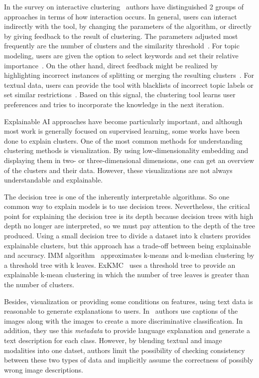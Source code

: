 \documentclass[
 twocolumn,
 hf,
]{ceurart}
\begin{document}
In the survey on interactive clustering~\cite{10.1145/3340960} authors have distinguished 2 groups of approaches in terms of how interaction occurs.
In general, users can interact indirectly with the tool, by changing the parameters of the algorithm, or directly by giving feedback to the result of clustering.
The parameters adjusted most frequently are the number of clusters and the similarity threshold~\cite{10.1007/978-3-319-23461-8_43,10.1016/j.eswa.2017.11.055}.
For topic modeling, users are given the option to select keywords and set their relative importance~\cite{ElAssady2018ProgressiveLO}. %
On the other hand, direct feedback might be realized by highlighting incorrect instances of splitting or merging the resulting clusters~\cite{10.1155/2017/4915828}. %
For textual data, users can provide the tool with blacklists of incorrect topic labels or set similar restrictions~\cite{Chang2016AppGrouperKI}. %
Based on this signal, the clustering tool learns user preferences and tries to incorporate the knowledge in the next iteration.

Explainable AI approaches have become particularly important, and although most work is generally focused on supervised learning, some works have been done to explain clusters.
One of the most common methods for understanding clustering methods is visualization. 
By using low-dimensionality embedding and displaying them in two- or three-dimensional dimensions, one can get an overview of the clusters and their data. 
However, these visualizations are not always understandable and explainable. 

The decision tree is one of the inherently interpretable algorithms. 
So one common way to explain models is to use decision trees. 
Nevertheless, the critical point for explaining the decision tree is its depth because decision trees with high depth no longer are interpreted, so we must pay attention to the depth of the tree produced. 
Using a small decision tree to divide a dataset into k clusters provides explainable clusters, but this approach has a trade-off between being explainable and accuracy. 
IMM algorithm~\cite{dasgupta2020explainable} approximates k-means and k-median clustering by a threshold tree with k leaves.
ExKMC~\cite{frost2020exkmc} uses a threshold tree to provide an explainable k-mean clustering in which the number of tree leaves is greater than the number of clusters.

Besides, visualization or providing some conditions on features, using text data is reasonable to generate explanations to users.
In~\cite{hendricks2016generating} authors use captions of the images along with the images to create a more discriminative classification. 
In addition, they use this \textit{metadata} to provide language explanation and generate a text description for each class.
However, by blending textual and image modalities into one datset, authors limit the possibility of checking consistency between these two types of data and implicitly assume the correctness of possibly wrong image descriptions.
\end{document}
